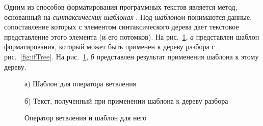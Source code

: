 Одним из способов форматирования программных текстов является метод, основанный на \emph{синтаксических шаблонах} \cite{paper:while}. %
Под \emph{шаблоном} понимаются данные, сопоставление которых с элементом синтаксического дерева дает текстовое представление этого элемента (и его потомков). 
На рис.~\ref{fig:templatecodeintro}, \emph{а} представлен шаблон форматирования, который может быть применен к дереву разбора с рис.~\ref{fig:ifTree}.
На рис.~\ref{fig:templatecodeintro}, \emph{б} представлен результат применения шаблона к этому дереву.

%  
%  
\begin{figure}[ht]
  \noindent
  \begin{minipage}{.4\textwidth}
    
    \caption*{а) Шаблон для оператора ветвления}    
  \end{minipage}
  \hfill
  \begin{minipage}{.5\textwidth}
    
    \caption*{б) Текст, полученный при применении шаблона к дереву разбора}    
  \end{minipage}
  \caption{Оператор ветвления и шаблон для него}    
  \label{fig:templatecodeintro}
\end{figure}


